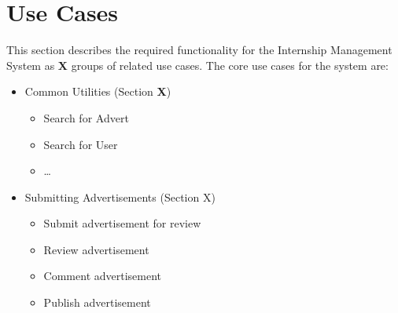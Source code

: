 \section{Use Cases}
\label{sec:usecases}

This section describes the required functionality for the Internship Management System as \textbf{X} groups of related use cases. 
The core use cases for the system are:

\begin{itemize}
  \item{Common Utilities (Section \textbf{X})}
    \begin{itemize}
      \item{Search for Advert}
      \item{Search for User}
      \item{\ldots}
    \end{itemize}
  \item{Submitting Advertisements (Section X)}
    \begin{itemize}
    \item{Submit advertisement for review}
    \item{Review advertisement}
    \item{Comment advertisement}
    \item{Publish advertisement}
    \end{itemize}
\end{itemize}
